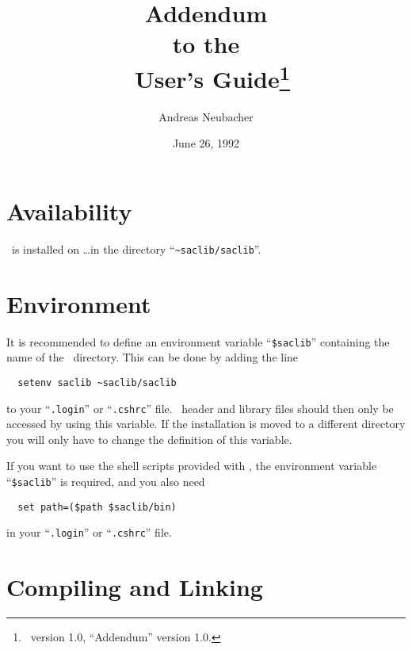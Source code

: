 \documentclass{article}
\begin{document}
\title{
Addendum\\to the\\\saclib\ User's Guide\thanks{
  \saclib\ version 1.0, ``Addendum'' version 1.0.
}
}

\author{Andreas Neubacher}
\date{June 26, 1992}
\maketitle

\section{Availability}

\saclib\ is installed on \ldots in the directory ``{\tt\~{ }saclib/saclib}''.


\section{Environment}

It is recommended to define an environment variable ``{\tt \$saclib}''
containing the name of the \saclib\ directory. This can be done by adding the
line
\begin{verbatim}
  setenv saclib ~saclib/saclib
\end{verbatim}
to your ``{\tt .login}'' or ``{\tt .cshrc}'' file. \saclib\ header and
library files should then only be accessed by using this variable. If the
installation is moved to a different directory you will only have to change
the definition of this variable.

If you want to use the shell scripts provided with \saclib, the environment
variable ``{\tt \$saclib}'' is required, and you also need
\begin{verbatim}
  set path=($path $saclib/bin)
\end{verbatim}
in your ``{\tt .login}'' or ``{\tt .cshrc}'' file.


\section{Compiling and Linking}
\end{document}
